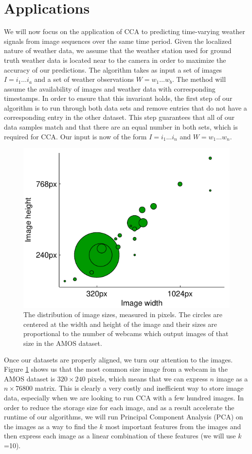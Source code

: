 \section{Applications}
We will now focus on the application of CCA to predicting time-varying weather signals from image sequences over the same time period. Given the localized nature of weather data, we assume that the weather station used for ground truth weather data is located near to the camera in order to maximize the accuracy of our predictions. The algorithm takes as input a set of images $I=i_1\ldots i_a$ and a set of weather observations $W=w_1\ldots w_b$. The method will assume the availability of images and weather data with corresponding timestamps. In order to ensure that this invariant holds, the first step of our algorithm is to run through both data sets and remove entries that do not have a corresponding entry in the other dataset. This step guarantees that all of our data samples match and that there are an equal number in both sets, which is required for CCA. Our input is now of the form $I=i_1\ldots i_n$ and $W=w_1\ldots w_n$.

\begin{figure}
	\centering
		\includegraphics{figures/imagedimensions.pdf}
	\caption{The distribution of image sizes, measured in pixels. The circles are centered at the width and height of the image and their sizes are proportional to the number of webcams which output images of that size in the AMOS dataset.}
	\label{fig:imagedimensions}
\end{figure}

Once our datasets are properly aligned, we turn our attention to the images. Figure \ref{fig:imagedimensions} shows us that the most common size image from a webcam in the AMOS dataset is $320\times 240$ pixels, which means that we can express $n$ image as a $n\times 76800$ matrix. This is clearly a very costly and inefficient way to store image data, especially when we are looking to run CCA with a few hundred images. In order to reduce the storage size for each image, and as a result accelerate the runtime of our algorithms, we will run Principal Component Analysis (PCA) on the images as a way to find the $k$ most important features from the images and then express each image as a linear combination of these features (we will use $k$=10). 

